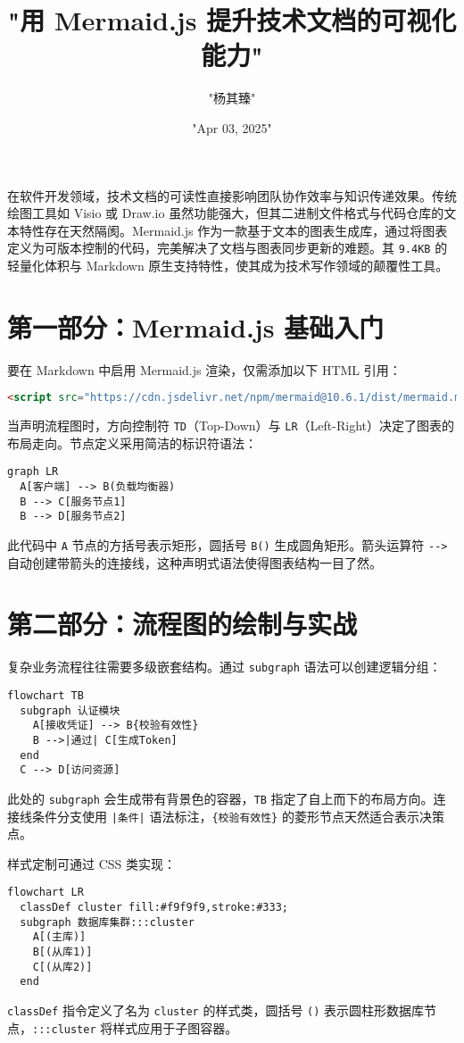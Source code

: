 \title{"用 Mermaid.js 提升技术文档的可视化能力"}
\author{"杨其臻"}
\date{"Apr 03, 2025"}
\maketitle
在软件开发领域，技术文档的可读性直接影响团队协作效率与知识传递效果。传统绘图工具如 Visio 或 Draw.io 虽然功能强大，但其二进制文件格式与代码仓库的文本特性存在天然隔阂。Mermaid.js 作为一款基于文本的图表生成库，通过将图表定义为可版本控制的代码，完美解决了文档与图表同步更新的难题。其 \verb!9.4KB! 的轻量化体积与 Markdown 原生支持特性，使其成为技术写作领域的颠覆性工具。\par
\chapter{第一部分：Mermaid.js 基础入门}
要在 Markdown 中启用 Mermaid.js 渲染，仅需添加以下 HTML 引用：\par
\begin{lstlisting}[language=html]
<script src="https://cdn.jsdelivr.net/npm/mermaid@10.6.1/dist/mermaid.min.js"></script>
\end{lstlisting}
当声明流程图时，方向控制符 \verb!TD!（Top-Down）与 \verb!LR!（Left-Right）决定了图表的布局走向。节点定义采用简洁的标识符语法：\par
\begin{lstlisting}[language=mermaid]
graph LR
  A[客户端] --> B(负载均衡器)
  B --> C[服务节点1]
  B --> D[服务节点2]
\end{lstlisting}
此代码中 \verb!A! 节点的方括号表示矩形，圆括号 \verb!B()! 生成圆角矩形。箭头运算符 \verb!-->! 自动创建带箭头的连接线，这种声明式语法使得图表结构一目了然。\par
\chapter{第二部分：流程图的绘制与实战}
复杂业务流程往往需要多级嵌套结构。通过 \verb!subgraph! 语法可以创建逻辑分组：\par
\begin{lstlisting}[language=mermaid]
flowchart TB
  subgraph 认证模块
    A[接收凭证] --> B{校验有效性}
    B -->|通过| C[生成Token]
  end
  C --> D[访问资源]
\end{lstlisting}
此处的 \verb!subgraph! 会生成带有背景色的容器，\verb!TB! 指定了自上而下的布局方向。连接线条件分支使用 \verb!|条件|! 语法标注，\verb!{校验有效性}! 的菱形节点天然适合表示决策点。\par
样式定制可通过 CSS 类实现：\par
\begin{lstlisting}[language=mermaid]
flowchart LR
  classDef cluster fill:#f9f9f9,stroke:#333;
  subgraph 数据库集群:::cluster
    A[(主库)]
    B[(从库1)]
    C[(从库2)]
  end
\end{lstlisting}
\verb!classDef! 指令定义了名为 \verb!cluster! 的样式类，圆括号 \verb!()! 表示圆柱形数据库节点，\verb!:::cluster! 将样式应用于子图容器。\par
